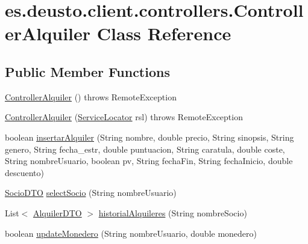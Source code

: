 \hypertarget{classes_1_1deusto_1_1client_1_1controllers_1_1_controller_alquiler}{}\section{es.\+deusto.\+client.\+controllers.\+Controller\+Alquiler Class Reference}
\label{classes_1_1deusto_1_1client_1_1controllers_1_1_controller_alquiler}
\subsection*{Public Member Functions}
\begin{DoxyCompactItemize}
\item 
\mbox{\hyperlink{classes_1_1deusto_1_1client_1_1controllers_1_1_controller_alquiler_afa1f8ce5feacaa7a210d2d04c971e506}{Controller\+Alquiler}} ()  throws Remote\+Exception 
\item 
\mbox{\hyperlink{classes_1_1deusto_1_1client_1_1controllers_1_1_controller_alquiler_a0b4f00dfc825b01070dc7d0306fb2f28}{Controller\+Alquiler}} (\mbox{\hyperlink{classes_1_1deusto_1_1client_1_1remote_1_1_service_locator}{Service\+Locator}} rsl)  throws Remote\+Exception 
\item 
boolean \mbox{\hyperlink{classes_1_1deusto_1_1client_1_1controllers_1_1_controller_alquiler_ad256b3ea1f84492bcbda49c58f914ffa}{insertar\+Alquiler}} (String nombre, double precio, String sinopsis, String genero, String fecha\+\_\+estr, double puntuacion, String caratula, double coste, String nombre\+Usuario, boolean pv, String fecha\+Fin, String fecha\+Inicio, double descuento)
\item 
\mbox{\hyperlink{classes_1_1deusto_1_1server_1_1dto_1_1_socio_d_t_o}{Socio\+D\+TO}} \mbox{\hyperlink{classes_1_1deusto_1_1client_1_1controllers_1_1_controller_alquiler_afdd84229addaa15630468eed667112cf}{select\+Socio}} (String nombre\+Usuario)
\item 
List$<$ \mbox{\hyperlink{classes_1_1deusto_1_1server_1_1dto_1_1_alquiler_d_t_o}{Alquiler\+D\+TO}} $>$ \mbox{\hyperlink{classes_1_1deusto_1_1client_1_1controllers_1_1_controller_alquiler_a1e6149df6b15308215186c42c73781aa}{historial\+Alquileres}} (String nombre\+Socio)
\item 
boolean \mbox{\hyperlink{classes_1_1deusto_1_1client_1_1controllers_1_1_controller_alquiler_ac3685c7249af72df0049f28543e3769e}{update\+Monedero}} (String nombre\+Usuario, double monedero)
\end{DoxyCompactItemize}


